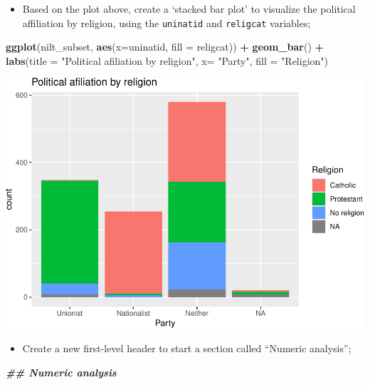 \documentclass[
]{book}
\newenvironment{Shaded}{\begin{snugshade}}{\end{snugshade}}
\newcommand{\AttributeTok}[1]{\textcolor[rgb]{0.13,0.29,0.53}{#1}}
\newcommand{\DocumentationTok}[1]{\textcolor[rgb]{0.56,0.35,0.01}{\textbf{\textit{#1}}}}
\newcommand{\FunctionTok}[1]{\textcolor[rgb]{0.13,0.29,0.53}{\textbf{#1}}}
\newcommand{\NormalTok}[1]{#1}
\newcommand{\SpecialCharTok}[1]{\textcolor[rgb]{0.81,0.36,0.00}{\textbf{#1}}}
\newcommand{\StringTok}[1]{\textcolor[rgb]{0.31,0.60,0.02}{#1}}
\providecommand{\tightlist}{%
  \setlength{\itemsep}{0pt}\setlength{\parskip}{0pt}}
\begin{document}
\begin{itemize}
\tightlist
\item
  Based on the plot above, create a `stacked bar plot' to visualize the political affiliation by religion, using the \texttt{uninatid} and \texttt{religcat} variables;
\end{itemize}

\begin{Shaded}
\begin{Highlighting}[]
\FunctionTok{ggplot}\NormalTok{(nilt\_subset, }\FunctionTok{aes}\NormalTok{(}\AttributeTok{x=}\NormalTok{uninatid, }\AttributeTok{fill =}\NormalTok{ religcat)) }\SpecialCharTok{+}
  \FunctionTok{geom\_bar}\NormalTok{() }\SpecialCharTok{+}
  \FunctionTok{labs}\NormalTok{(}\AttributeTok{title =} \StringTok{"Political afiliation by religion"}\NormalTok{, }
       \AttributeTok{x=} \StringTok{"Party"}\NormalTok{, }\AttributeTok{fill =} \StringTok{"Religion"}\NormalTok{)}
\end{Highlighting}
\end{Shaded}

\begin{flushleft}\includegraphics[width=1\linewidth]{lab-workbook_files/figure-latex/unnamed-chunk-128-1} \end{flushleft}

\begin{itemize}
\tightlist
\item
  Create a new first-level header to start a section called ``Numeric analysis'';
\end{itemize}

\begin{Shaded}
\begin{Highlighting}[]
\DocumentationTok{\#\# Numeric analysis}
\end{Highlighting}
\end{Shaded}
\end{document}
